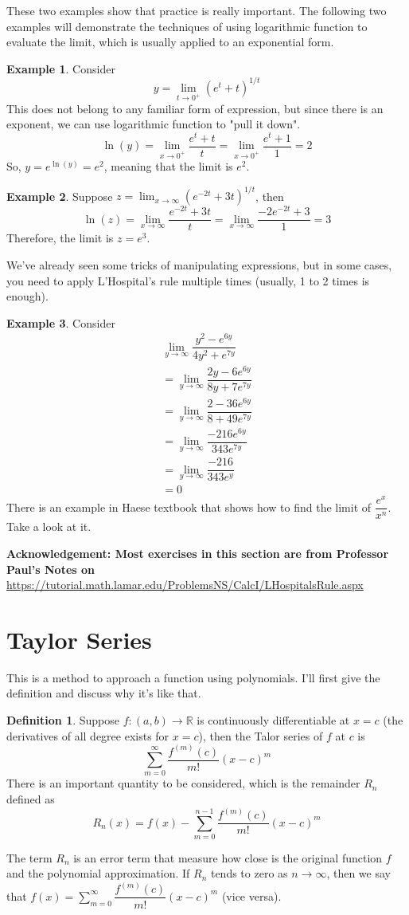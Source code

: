 \documentclass{article}
\theoremstyle{definition}
\theoremstyle{definition}
\newtheorem{definition}{Definition}
\theoremstyle{definition}
\theoremstyle{definition}
\theoremstyle{definition}
\theoremstyle{definition}
\newtheorem{example}{Example}
\theoremstyle{definition}
\theoremstyle{definition}
\theoremstyle{definition}
\begin{document}
These two examples show that practice is really important. The following two examples will demonstrate the techniques of using logarithmic function to evaluate the limit, which is usually applied to an exponential form.
\begin{example}
Consider
\[
y=\lim_{t\to 0^+}(e^t+t)^{1/t}
\]
This does not belong to any familiar form of expression, but since there is an exponent, we can use logarithmic function to "pull it down".
\[
\ln(y)=\lim_{x\to 0^+}\dfrac{e^t+t}{t}=\lim_{x\to 0^+}\dfrac{e^t+1}{1}=2
\]
So, $y=e^{\ln(y)}=e^2$, meaning that the limit is $e^2$.
\end{example}
\begin{example}
Suppose $z=\lim_{x\to \infty}(e^{-2t}+3t)^{1/t}$, then
\[
\ln(z)=\lim_{x\to \infty}\dfrac{e^{-2t}+3t}{t}=\lim_{x\to\infty}\dfrac{-2e^{-2t}+3}{1}=3
\]
Therefore, the limit is $z=e^3$.
\end{example}
We've already seen some tricks of manipulating expressions, but in some cases, you need to apply L'Hospital's rule multiple times (usually, 1 to 2 times is enough).
\begin{example}
Consider
\begin{align*}
\lim_{y\to\infty}\dfrac{y^2-e^{6y}}{4y^2+e^{7y}}\\
=\lim_{y\to\infty}\dfrac{2y-6e^{6y}}{8y+7e^{7y}}\\
=\lim_{y\to\infty}\dfrac{2-36e^{6y}}{8+49e^{7y}}\\
=\lim_{y\to\infty}\dfrac{-216e^{6y}}{343e^{7y}}\\
=\lim_{y\to\infty}\dfrac{-216}{343e^y}\\
=0
\end{align*}
There is an example in Haese textbook that shows how to find the limit of $\dfrac{e^x}{x^n}$. Take a look at it.
\end{example}

\textbf{Acknowledgement: Most exercises in this section are from Professor Paul's Notes on} \url{https://tutorial.math.lamar.edu/ProblemsNS/CalcI/LHospitalsRule.aspx}

\section{Taylor Series}
This is a method to approach a function using polynomials. I'll first give the definition and discuss why it's like that.
\begin{definition}
Suppose $f:(a,b)\to\mathbb{R}$ is continuously differentiable at $x=c$ (the derivatives of all degree exists for $x=c$), then the Talor series of $f$ at $c$ is
\[
\sum_{m=0}^\infty\dfrac{f^{(m)}(c)}{m!}(x-c)^m
\]
There is an important quantity to be considered, which is the remainder $R_n$ defined as
\[
R_n(x)=f(x)-\sum_{m=0}^{n-1}\dfrac{f^{(m)}(c)}{m!}(x-c)^m
\]
\end{definition}
The term $R_n$ is an error term that measure how close is the original function $f$ and the polynomial approximation. If $R_n$ tends to zero as $n\to \infty$, then we say that $f(x)=\sum_{m=0}^\infty\dfrac{f^{(m)}(c)}{m!}(x-c)^m$ (vice versa).
\end{document}
